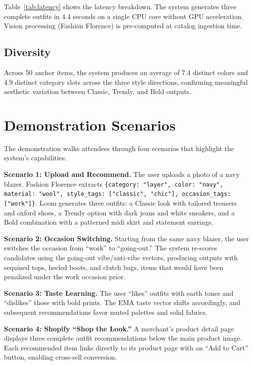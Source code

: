 \documentclass[sigconf]{acmart}
\begin{document}
Table~\ref{tab:latency} shows the latency breakdown.  The system
generates three complete outfits in 4.4 seconds on a single CPU core
without GPU acceleration.  Vision processing (Fashion Florence) is
pre-computed at catalog ingestion time.

\subsection{Diversity}

Across 50 anchor items, the system produces an average of 7.4 distinct
colors and 4.9 distinct category slots across the three style directions,
confirming meaningful aesthetic variation between Classic, Trendy, and Bold
outputs.

\section{Demonstration Scenarios}

The demonstration walks attendees through four scenarios that highlight
the system's capabilities:

\textbf{Scenario 1: Upload and Recommend.}
The user uploads a photo of a navy blazer.  Fashion Florence extracts
\texttt{\{category: "layer", color: "navy", material: "wool",
style\_tags: ["classic", "chic"], occasion\_tags: ["work"]\}}.  Loom
generates three outfits: a Classic look with tailored trousers and
oxford shoes, a Trendy option with dark jeans and white sneakers, and a
Bold combination with a patterned midi skirt and statement earrings.

\textbf{Scenario 2: Occasion Switching.}
Starting from the same navy blazer, the user switches the occasion from
``work'' to ``going-out.''  The system re-scores candidates using the
going-out vibe/anti-vibe vectors, producing outputs with sequined tops,
heeled boots, and clutch bags, items that would have been penalized under
the work occasion prior.

\textbf{Scenario 3: Taste Learning.}
The user ``likes'' outfits with earth tones and ``dislikes'' those with
bold prints.  The EMA taste vector shifts accordingly, and subsequent
recommendations favor muted palettes and solid fabrics.

\textbf{Scenario 4: Shopify ``Shop the Look.''}
A merchant's product detail page displays three complete outfit
recommendations below the main product image.  Each recommended item links
directly to its product page with an ``Add to Cart'' button, enabling
cross-sell conversion.
\end{document}
